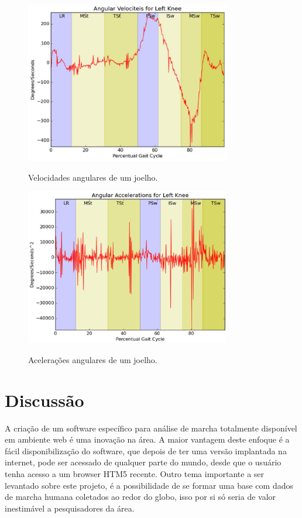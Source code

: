 \documentclass[journal]{IEEEtran}
\begin{document}
\begin{figure}[!t]
	\centering
	{\includegraphics[width=9cm]{tela26}}
	\caption{Velocidades angulares de um joelho. }
	\label{va}
\end{figure}

\begin{figure}[!t]
	\centering
	{\includegraphics[width=9cm]{angular_accelerations}}
	\caption{Acelerações angulares de um joelho.}
	\label{angular_accelerations}
\end{figure}

\section{Discussão}

A criação de um software específico para análise de marcha totalmente disponível em ambiente web é
uma inovação na área. A maior vantagem deste enfoque é a fácil disponibilização do software,
que depois de ter uma versão implantada na internet, pode ser acessado de qualquer parte do mundo,
desde que o usuário tenha acesso a um browser HTM5 recente.
Outro tema importante a ser levantado sobre este projeto, é a possibilidade de se formar uma base
com dados de marcha humana coletados ao redor do globo, isso por si só seria de valor inestimável
a pesquisadores da área.
\end{document}
